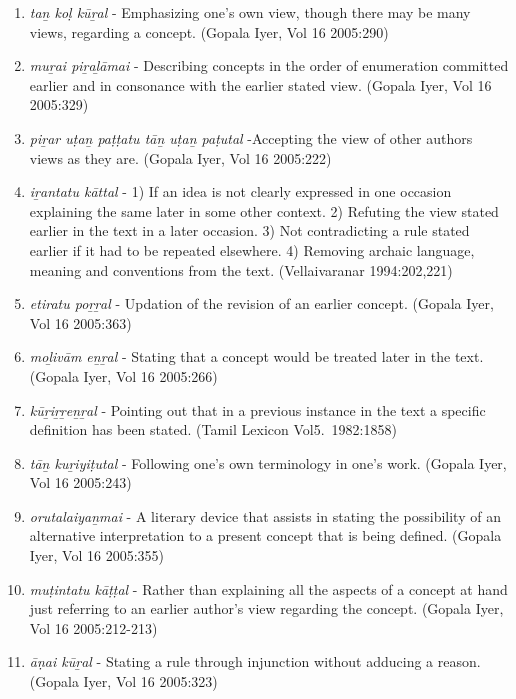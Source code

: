 \begin{enumerate}
 \item \textit{taṉ koḷ kūṟal} - Emphasizing one’s own view, though there may be many views, regarding a concept. (Gopala Iyer, Vol 16 2005:290)

 \item \textit{muṟai piṟaḻāmai} - Describing concepts in the order of enumeration committed earlier and in consonance with the earlier stated view. (Gopala Iyer, Vol 16 2005:329)

 \item \textit{piṟar uṭaṉ paṭṭatu tāṉ uṭaṉ paṭutal} -Accepting the view of other authors views as they are. (Gopala Iyer, Vol 16 2005:222)

 \item \textit{iṟantatu kāttal} - 1) If an idea is not clearly expressed in one occasion explaining the same later in some other context. 2) Refuting the view stated earlier in the text in a later occasion. 3) Not contradicting a rule stated earlier if it had to be repeated elsewhere. 4) Removing archaic language, meaning and conventions from the text. (Vellaivaranar 1994:202,221)

 \item \textit{etiratu poṟṟal} - Updation of the revision of an earlier concept. (Gopala Iyer, Vol 16 2005:363)

 \item \textit{moḻivām eṉṟal} - Stating that a concept would be treated later in the text. (Gopala Iyer, Vol 16 2005:266)

 \item \textit{kūṟiṟṟeṉṟal} - Pointing out that in a previous instance in the text a specific definition has been stated. (Tamil Lexicon Vol5.~1982:1858)

 \item \textit{tāṉ kuṟiyiṭutal} - Following one’s own terminology in one’s work. (Gopala Iyer, Vol 16 2005:243)

 \item \textit{orutalaiyaṉmai} - A literary device that assists in stating the possibility of an alternative interpretation to a present concept that is being defined. (Gopala Iyer, Vol 16 2005:355)

 \item \textit{muṭintatu kāṭṭal} - Rather than explaining all the aspects of a concept at hand just referring to an earlier author’s view regarding the concept. (Gopala Iyer, Vol 16 2005:212-213)

 \item \textit{āṇai kūṟal} - Stating a rule through injunction without adducing a reason. (Gopala Iyer, Vol 16 2005:323)


\end{enumerate}
